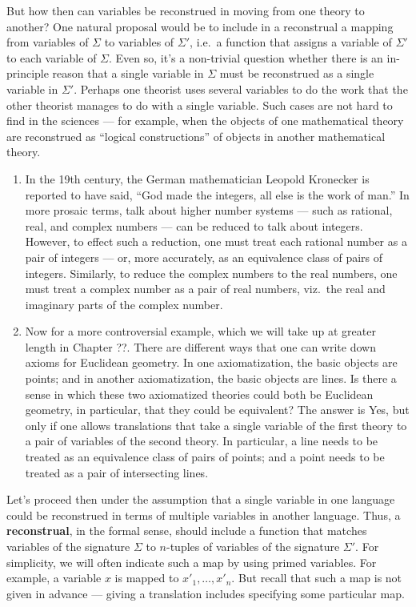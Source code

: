 \documentclass[11pt,fleqn]{article}
\theoremstyle{definition}
\theoremstyle{remark}
\newcommand{\2}{\mathscr}
\newcounter{axi}\setcounter{axi}{0}
\begin{document}
But how then can variables be reconstrued in moving from one theory to
another?  One natural proposal would be to include in a reconstrual a
mapping from variables of $\Sigma$ to variables of $\Sigma '$, i.e.\ a
function that assigns a variable of $\Sigma '$ to each variable of
$\Sigma$.  Even so, it's a non-trivial question whether there is an
in-principle reason that a single variable in $\Sigma$ must be
reconstrued as a single variable in $\Sigma '$.  Perhaps one theorist
uses several variables to do the work that the other theorist manages
to do with a single variable.  Such cases are not hard to find in the
sciences --- for example, when the objects of one mathematical theory
are reconstrued as ``logical constructions'' of objects in another
mathematical theory.

\begin{enumerate}
\item In the 19th century, the German mathematician Leopold Kronecker
  is reported to have said, ``God made the integers, all else is the
  work of man.''  In more prosaic terms, talk about higher number
  systems --- such as rational, real, and complex numbers --- can be
  reduced to talk about integers.  However, to effect such a
  reduction, one must treat each rational number as a pair of integers
  --- or, more accurately, as an equivalence class of pairs of
  integers.  Similarly, to reduce the complex numbers to the real
  numbers, one must treat a complex number as a pair of real numbers,
  viz.\ the real and imaginary parts of the complex number.
\item Now for a more controversial example, which we will take up at
  greater length in Chapter ??.  There are different ways that one can
  write down axioms for Euclidean geometry.  In one axiomatization,
  the basic objects are points; and in another axiomatization, the
  basic objects are lines.  Is there a sense in which these two
  axiomatized theories could both be Euclidean geometry, in
  particular, that they could be equivalent?  The answer is Yes, but
  only if one allows translations that take a single variable of the
  first theory to a pair of variables of the second theory.  In
  particular, a line needs to be treated as an equivalence class of
  pairs of points; and a point needs to be treated as a pair of
  intersecting lines.
  \end{enumerate}

  Let's proceed then under the assumption that a single variable in
  one language could be reconstrued in terms of multiple variables in
  another language.  Thus, a \textbf{reconstrual}, in the formal
  sense, should include a function that matches variables of the
  signature $\Sigma$ to $n$-tuples of variables of the signature
  $\Sigma'$.  For simplicity, we will often indicate such a map by
  using primed variables.  For example, a variable $x$ is mapped to
  $x'_1,\dots ,x'_n$.  But recall that such a map is not given in
  advance --- giving a translation includes specifying some particular
  map.
\end{document}
